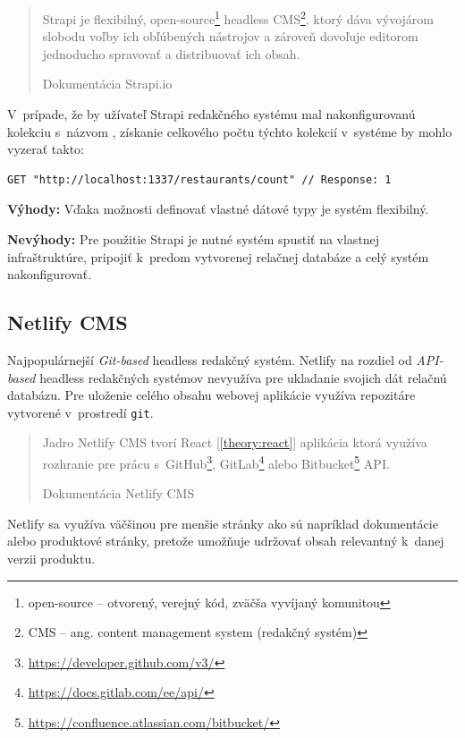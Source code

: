\blockquote[Dokumentácia Strapi.io \cite{StrapiDocs}]{Strapi je flexibilný, open-source\footnote{open-source -- otvorený, verejný kód, zväčša vyvíjaný komunitou} headless CMS\footnote{CMS -- ang. content management system (redakčný systém)}, ktorý dáva vývojárom slobodu voľby ich obľúbených nástrojov a zároveň dovoľuje editorom jednoducho spravovať a distribuovať ich obsah.}

\noindent V~prípade, že by užívateľ Strapi redakčného systému mal nakonfigurovanú kolekciu s~názvom , získanie celkového počtu týchto kolekcií v~systéme by mohlo vyzerať takto: \\

\begin{lstlisting}[caption=Príklad HTTP požiadavku na REST rozhranie Strapi.]
	GET "http://localhost:1337/restaurants/count" // Response: 1
\end{lstlisting}

\medskip

\noindent \textbf{Výhody:} Vďaka možnosti definovať vlastné dátové typy je systém flexibilný.

\medskip

\noindent \textbf{Nevýhody:} Pre použitie Strapi je nutné systém spustiť na vlastnej infraštruktúre, pripojiť k~predom vytvorenej relačnej databáze a celý systém nakonfigurovať.

\subsection{Netlify CMS}
Najpopulárnejší \emph{Git-based} headless redakčný systém. Netlify na rozdiel od \emph{API-based} headless redakčných systémov nevyužíva pre ukladanie svojich dát relačnú databázu. Pre uloženie celého obsahu webovej aplikácie využíva repozitáre vytvorené v~prostredí \texttt{git}.

\blockquote[Dokumentácia Netlify CMS \cite{NetlifyDocs}]{Jadro Netlify CMS tvorí React [\ref{theory:react}] aplikácia ktorá využíva rozhranie pre prácu s~GitHub\footnote{\href{https://developer.github.com/v3/}{https://developer.github.com/v3/}}, GitLab\footnote{\href{https://docs.gitlab.com/ee/api/}{https://docs.gitlab.com/ee/api/}} alebo Bitbucket\footnote{\href{https://confluence.atlassian.com/bitbucket/}{https://confluence.atlassian.com/bitbucket/}} API.}

\noindent Netlify sa využíva väčšinou pre menšie stránky ako sú napríklad dokumentácie alebo produktové stránky, pretože umožňuje udržovať obsah relevantný k~danej verzii produktu. \\

